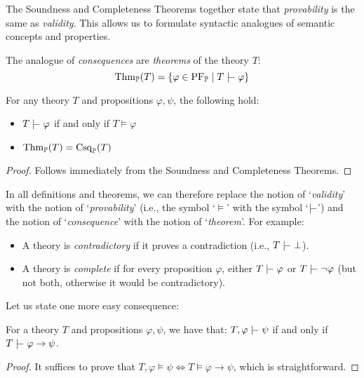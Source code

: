 The Soundness and Completeness Theorems together state that \emph{provability} is the same as \emph{validity}. This allows us to formulate syntactic analogues of semantic concepts and properties.

The analogue of \emph{consequences} are \emph{theorems} of the theory $T$:
$$
\Thm_\mathbb{P}(T) = \{\varphi \in \VF_\mathbb{P} \mid T \proves \varphi\}
$$

\begin{corollary}[Provability = Validity]\label{corollary:corollary-of-soundness-and-completeness}
    For any theory $T$ and propositions $\varphi, \psi$, the following hold:
    \begin{itemize}
        \item $T \proves \varphi$ if and only if $T \models \varphi$
        \item $\operatorname{Thm}_\mathbb{P}(T) = \operatorname{Csq}_\mathbb{P}(T)$
    \end{itemize}
\end{corollary}
\begin{proof}
    Follows immediately from the Soundness and Completeness Theorems.
\end{proof}

In all definitions and theorems, we can therefore replace the notion of `\emph{validity}' with the notion of `\emph{provability}' (i.e., the symbol `$\models$' with the symbol `$\proves$') and the notion of `\emph{consequence}' with the notion of `\emph{theorem}'. For example:
\begin{itemize}
    \item A theory is \emph{contradictory} if it proves a contradiction (i.e., $T \proves \bot$).
    \item A theory is \emph{complete} if for every proposition $\varphi$, either $T \proves \varphi$ or $T \proves \neg \varphi$ (but not both, otherwise it would be contradictory).
\end{itemize}

Let us state one more easy consequence:

\begin{theorem}
For a theory $T$ and propositions $\varphi, \psi$, we have that:
$T, \varphi \proves \psi$ if and only if $T \proves \varphi \to \psi$.
\end{theorem}
\begin{proof}
    It suffices to prove that $T, \varphi \models \psi \Leftrightarrow T \models \varphi \to \psi$, which is straightforward.
\end{proof}

